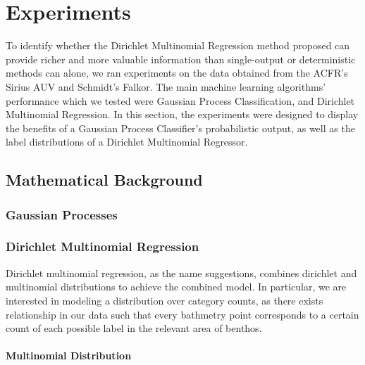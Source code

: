 \makeatletter
\renewcommand{\fnum@figure}{Figure \thefigure}
\makeatother

\chapter{Experiments} \label{chap:experiments}

To identify whether the Dirichlet Multinomial Regression method proposed can provide richer and more valuable information than single-output or deterministic methods can alone, we ran experiments on the data obtained from the ACFR's Sirius AUV and Schmidt's Falkor. The main machine learning algorithms' performance which we tested were Gaussian Process Classification, and Dirichlet Multinomial Regression. In this section, the experiments were designed to display the benefits of a Gaussian Process Classifier's probabilistic output, as well as the label distributions of a Dirichlet Multinomial Regressor.

\section{Mathematical Background}

\subsection{Gaussian Processes}



\subsection{Dirichlet Multinomial Regression}

Dirichlet multinomial regression, as the name suggestions, combines dirichlet and multinomial distributions to achieve the combined model. In particular, we are interested in modeling a distribution over category counts, as there exists relationship in our data such that every bathmetry point corresponds to a certain count of each possible label in the relevant area of benthos. 

\subsubsection{Multinomial Distribution}

